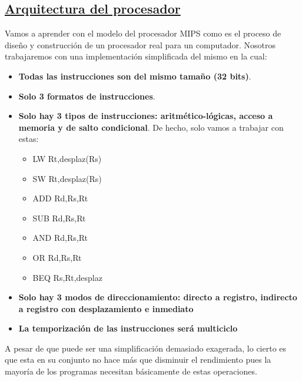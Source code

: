 \documentclass[a4paper,10pt]{book}
\begin{document}
\subsection*{\underline{Arquitectura del procesador}}
Vamos a aprender con el modelo del procesador MIPS como es el proceso de diseño y construcción de un procesador real para un computador. Nosotros trabajaremos con una implementación simplificada del mismo en la cual:
\begin{itemize}
\item \textbf{Todas las instrucciones son del mismo tamaño (32 bits)}.
\item \textbf{Solo 3 formatos de instrucciones}.
\item \textbf{Solo hay 3 tipos de instrucciones: aritmético-lógicas, acceso a memoria y de salto condicional}. De hecho, solo vamos a trabajar con estas:
	\begin{itemize}
	\item LW Rt,desplaz(Rs)
	\item SW Rt,desplaz(Rs)
	\item ADD Rd,Rs,Rt
	\item SUB Rd,Rs,Rt
	\item AND Rd,Rs,Rt
	\item OR Rd,Rs,Rt
	\item BEQ Rs,Rt,desplaz
	\end{itemize}
\item \textbf{Solo hay 3 modos de direccionamiento: directo a registro, indirecto a registro con desplazamiento e inmediato}
\item \textbf{La temporización de las instrucciones será multiciclo}
\end{itemize}
A pesar de que puede ser una simplificación demasiado exagerada, lo cierto es que esta en su conjunto no hace más que disminuir el rendimiento pues la mayoría de los programas necesitan básicamente de estas operaciones.
\end{document}
